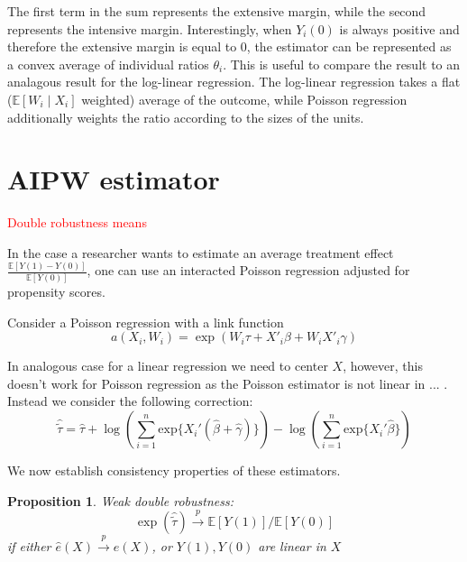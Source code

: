 \documentclass[a4paper,12pt]{article}
\theoremstyle{plain}
\newtheorem{prop}{Proposition}
\begin{document}

The first term in the sum represents the extensive margin, while the second represents the intensive margin. Interestingly, when $Y_i(0)$ is always positive and therefore the extensive margin is equal to 0, the estimator can be represented as a convex average of individual ratios $\theta_i$. This is useful to compare the result to an analagous result for the log-linear regression. The log-linear regression takes a flat ($\mathbb{E}[W_i \mid X_i]$ weighted) average of the outcome, while Poisson regression additionally weights the ratio according to the sizes of the units.

\section{AIPW estimator}

    \textcolor{red}{Double robustness means}

    In the case a researcher wants to estimate an average treatment effect $\frac{\mathbb{E}[Y(1) - Y(0)]}{\mathbb{E}[Y(0)]}$, one can use an interacted Poisson regression adjusted for propensity scores.

    Consider a Poisson regression with a link function
    $$a(X_i, W_i) = \exp(W_i\tau + X'_i\beta + W_iX'_i\gamma)$$

    In analogous case for a linear regression we need to center $X$, however, this doesn't work for Poisson regression as the Poisson estimator is not linear in ... . Instead we consider the following correction:
    \begin{equation*}
    \hat{\tilde{\tau}} = \hat{\tau} + \log \left(\sum_{i=1}^{n}\mathrm{exp}\{X_i'(\hat{\beta} + \hat{\gamma})\}\right) - \log \left(\sum_{i=1}^{n}\mathrm{exp}\{X_i'\hat{\beta}\}\right)    
    \end{equation*}

    We now establish consistency properties of these estimators.

    \begin{prop}
    Weak double robustness:
        $$\exp(\hat{\tilde{\tau}}) \stackrel{p}{\to} \mathbb{E}[Y(1)] / \mathbb{E}[Y(0)]$$ if either $\hat e(X) \stackrel{p}{\to} e(X)$, or $Y(1), Y(0)$ are linear in $X$
    \end{prop}
\end{document}
